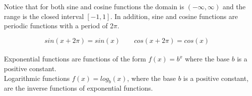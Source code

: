 Notice that for both sine and cosine functions the domain is \((-\infty, \infty)\) and the range is the closed interval \([-1, 1]\). In addition, sine and cosine functions are periodic functions with a period of 2\(\pi\). 

$$sin(x+2\pi)=sin(x) \quad \quad cos(x+2\pi)=cos(x)$$\\

Exponential functions are functions of the form \(f(x)=b^x\) where the base \(b\) is a positive constant.\\

Logarithmic functions \(f(x)=log_b(x)\), where the base \(b\) is a positive constant, are the inverse functions of exponential functions.\\
